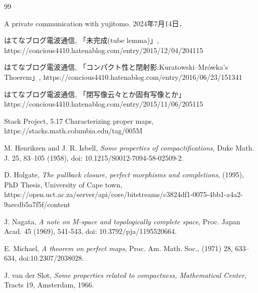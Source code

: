 \documentclass[leqno, a4paper, 12pt, dvipdfmx]{jsarticle}
\begin{document}
\begin{thebibliography}{99}


A private communication with yujitomo. 
2024年7月14日．

はてなブログ電波通信, 
「未完成(tube lemma)」, 
https://concious4410.hatenablog.com/entry/2015/12/04/204115


はてなブログ電波通信, 
「コンパクト性と閉射影:Kuratowski--Mr\'{o}wka's Thoerem」, 
https://concious4410.hatenablog.com/entry/2016/06/23/151341

はてなブログ電波通信, 
「閉写像云々とか固有写像とか」
https://concious4410.hatenablog.com/entry/2015/11/06/205115

Stack Project, 5.17 Characterizing proper maps, 
https://stacks.math.columbia.edu/tag/005M



M. Henriksen and J. R. Isbell, 
\textit{Some properties of compactifications}, 
Duke Math. J. 25, 83--105 (1958), 
doi: 10.1215/S0012-7094-58-02509-2. 

D. Holgate,  
\textit{The pullback closure, perfect morphisms and completions},  (1995), PhD Thesis, University of Cape town, 
https://open.uct.ac.za/server/api/core/bitstreams/c3824df1-0075-4bb1-a4a2-9aecdb5a7f5f/content


J. Nagata, 
\textit{A note on M-space and topologically complete space}, Proc. Japan
Acad. 45 (1969), 541-543, 
doi: 10.3792/pja/1195520664. 

E. Michael, 
\textit{A theorem on perfect maps}, 
Proc. Am. Math. Soc., 
(1971) 28, 
633--634,
doi:10.2307/2038028. 

 J. van der Slot, 
 \textit{Some properties related to compactness, Mathematical Center}, 
Tracts 19, Amsterdam, 1966.

\end{thebibliography}
\end{document}
